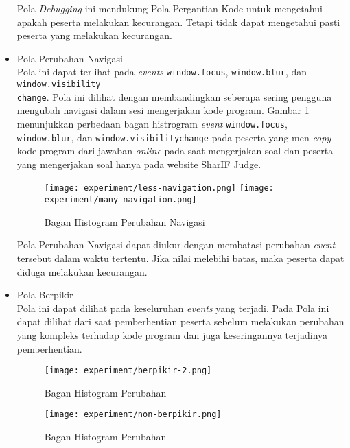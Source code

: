 \begin{itemize}
    Pola \textit{Debugging} ini mendukung Pola Pergantian Kode untuk mengetahui apakah peserta melakukan kecurangan. Tetapi tidak dapat mengetahui pasti peserta yang melakukan kecurangan.

    \item Pola Perubahan Navigasi \\
    Pola ini dapat terlihat pada \textit{events} \verb|window.focus|, \verb|window.blur|, dan \verb|window.visibility|\\\verb|change|. Pola ini dilihat dengan membandingkan seberapa sering pengguna mengubah navigasi dalam sesi mengerjakan kode program. 
    Gambar \ref{fig:5:2:3:navigation} menunjukkan perbedaan bagan histrogram \textit{event} \verb|window.focus|, \verb|window.blur|, dan \verb|window.visibilitychange| pada peserta yang men-\textit{copy} kode program dari jawaban \textit{online} pada saat mengerjakan soal dan peserta yang mengerjakan soal hanya pada website SharIF Judge.  

    \begin{figure}[H]
        \centering
        \texttt{[image: experiment/less-navigation.png]}
        \texttt{[image: experiment/many-navigation.png]}
        \caption{Bagan Histogram Perubahan Navigasi}
        \label{fig:5:2:3:navigation}
    \end{figure}

    Pola Perubahan Navigasi dapat diukur dengan membatasi perubahan \textit{event} tersebut dalam waktu tertentu. Jika nilai melebihi batas, maka peserta dapat diduga melakukan kecurangan.

    \item Pola Berpikir \\
    Pola ini dapat dilihat pada keseluruhan \textit{events} yang terjadi. Pada Pola ini dapat dilihat dari saat pemberhentian peserta sebelum melakukan perubahan yang kompleks terhadap kode program dan juga keseringannya terjadinya pemberhentian.
    
    \begin{figure}
        \centering
        \texttt{[image: experiment/berpikir-2.png]}
        \caption{Bagan Histogram Perubahan}
        \label{fig:5:2:3:berpikir}
    \end{figure}

    \begin{figure}
        \centering
        \texttt{[image: experiment/non-berpikir.png]}
        \caption{Bagan Histogram Perubahan}
        \label{fig:5:2:3:tidakberpikir}
    \end{figure}


\end{itemize}
